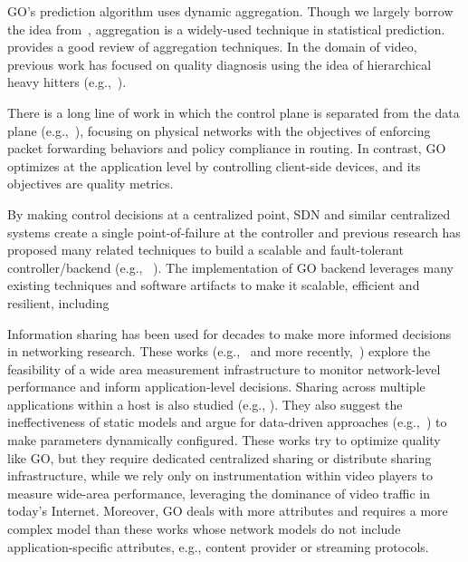  GO's prediction algorithm uses dynamic aggregation. Though we largely borrow the idea from~\cite{george2008value}, aggregation is a widely-used technique in statistical prediction. \cite{stemm2000network} provides a good review of aggregation techniques. In the domain of video, previous work has focused on quality diagnosis using the idea of hierarchical heavy hitters (e.g.,~\cite{hhh,iptv-sigcomm09}).


 There is a long line of work in which the control plane is separated from the data plane (e.g.,~\cite{rcp,onix,yan2007tesseract,openflow}), focusing on physical networks with the objectives of enforcing packet forwarding behaviors and policy compliance in routing. In contrast, GO optimizes at the application level by controlling client-side devices, and its objectives are quality metrics.

 By making control decisions at a centralized point, SDN and similar centralized systems create a single point-of-failure at the controller and previous research has proposed many related techniques to build a scalable and fault-tolerant controller/backend (e.g., ~\cite{tootoonchian2012controller,yan2007tesseract}). The implementation of GO backend leverages many existing techniques and software artifacts to make it scalable, efficient and resilient, including~\cite{spark,hadoop,zaharia2012resilient,kreps2011kafka}

 Information sharing has been used for decades to make more informed decisions in networking research. These works (e.g.,~\cite{stemm2000network} and more recently,~\cite{choffnes2010crowdsourcing}) explore the feasibility of a wide area measurement infrastructure to monitor network-level performance and inform application-level decisions. Sharing across multiple applications within a host is also studied (e.g., \cite{balakrishnan1999integrated}). They also suggest the ineffectiveness of static models and argue for data-driven approaches (e.g.,~\cite{Winstein:2013:TEM:2486001.2486020, sivaraman2013no}) to make parameters dynamically configured.
These works try to optimize quality like GO, but they require dedicated centralized sharing or distribute sharing infrastructure, while we rely only on instrumentation within video players to measure wide-area performance, leveraging the dominance of video traffic in today's Internet. Moreover, GO deals with more attributes and requires a more complex model than these works whose network models do not include application-specific attributes, e.g., content provider or streaming protocols. 
